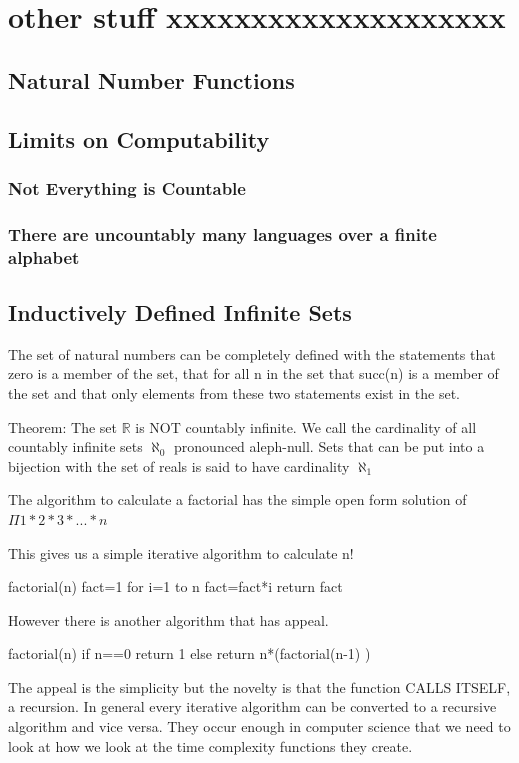 \documentclass[11pt]{book} %
\theoremstyle {definition}
\theoremstyle {remark}
\begin{document}
 \section {other stuff xxxxxxxxxxxxxxxxxxxx}
    \subsection {Natural Number Functions}
    \subsection {Limits on Computability}
        \subsubsection {Not Everything is Countable}
        \subsubsection {There are uncountably many languages over a finite alphabet}
    \subsection {Inductively Defined Infinite Sets}
The set of natural numbers can be completely defined with the statements that zero is a member of the set, that for all n in the set that succ(n) is a member of the set and that only elements from these two statements exist in the set. 


Theorem: The set $\mathbb{R}$ is NOT countably infinite. We call the cardinality of all countably infinite sets $\aleph _0$ pronounced aleph-null. Sets that can be put into a bijection with the set of reals is said to have cardinality $\aleph_1$


The algorithm to calculate a factorial has the simple open form solution of 
$\Pi{1*2*3* ... *n}$

This gives us a simple iterative algorithm to calculate n!

factorial(n)
fact=1
for i=1 to n
    fact=fact*i
return fact

However there is another algorithm that has appeal.

factorial(n)
if n==0
    return 1
else
    return n*(factorial(n-1) )

The appeal is the simplicity but the novelty is that the function CALLS ITSELF, a recursion. In general every iterative algorithm can be converted to a recursive algorithm and vice versa. They occur enough in computer science that we need to look at how we look at the time complexity functions they create.
\end{document}

